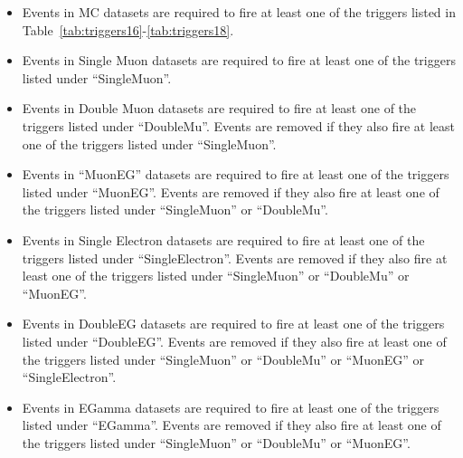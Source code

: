 \begin{itemize}
\item Events in MC datasets are required to fire at least one of the triggers listed in Table~\ref{tab:triggers16}-\ref{tab:triggers18}. 
\item Events in Single Muon datasets are required to fire at least one of the triggers listed under ``SingleMuon''. 
\item Events in Double Muon datasets are required to fire at least one of the triggers listed under ``DoubleMu''. Events are removed if they also fire at least one of the triggers listed under ``SingleMuon''.
\item Events in ``MuonEG'' datasets are required to fire at least one of the triggers listed under ``MuonEG''. Events are removed if they also fire at least one of the triggers listed under ``SingleMuon'' or ``DoubleMu''.
\item Events in Single Electron datasets are required to fire at least one of the triggers listed under ``SingleElectron''. Events are removed if they also fire at least one of the triggers listed under ``SingleMuon'' or ``DoubleMu'' or ``MuonEG''.
\item Events in DoubleEG datasets are required to fire at least one of the triggers listed under ``DoubleEG''. Events are removed if they also fire at least one of the triggers listed under ``SingleMuon'' or ``DoubleMu'' or ``MuonEG'' or ``SingleElectron''.
\item Events in EGamma datasets are required to fire at least one of the triggers listed under ``EGamma''. Events are removed if they also fire at least one of the triggers listed under ``SingleMuon'' or ``DoubleMu'' or ``MuonEG''.
\end{itemize}
